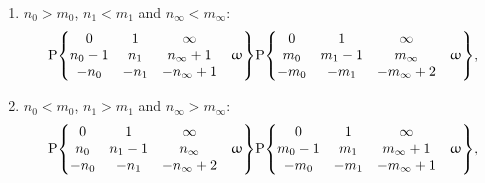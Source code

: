 \begin{enumerate}
   \item $n_{0} > m_{0}$, $n_{1} < m_{1}$ and $n_{\infty} < m_{\infty}$:
     \begin{equation}
       \rP\qty{
         \mqty{
           0
           &
           1
           &
           \infty
           &
           \\
           n_{0} - 1
           &
           n_{1}
           &
           n_{\infty} + 1
           &
           \omega
           \\
           -n_{0}
           &
           -n_{1}
           &
           -n_{\infty} + 1
           &
         }
       }
       \rP\qty{
         \mqty{
           0
           &
           1
           &
           \infty
           &
           \\
           m_{0}
           &
           m_{1} - 1
           &
           m_{\infty}
           &
           \omega
           \\
           -m_{0}
           &
           -m_{1}
           &
           -m_{\infty} + 2
           &
         }
       },
       \label{eq:X_solution><<}
     \end{equation}

   \item $n_{0} < m_{0}$, $n_{1} > m_{1}$ and $n_{\infty} > m_{\infty}$:
     \begin{equation}
       \rP\qty{
         \mqty{
           0
           &
           1
           &
           \infty
           &
           \\
           n_{0}
           &
           n_{1} - 1
           &
           n_{\infty}
           &
           \omega
           \\
           -n_{0}
           &
           -n_{1}
           &
           -n_{\infty} + 2
           &
         }
       }
       \rP\qty{
         \mqty{
           0
           &
           1
           &
           \infty
           &
           \\
           m_{0} - 1
           &
           m_{1}
           &
           m_{\infty} + 1
           &
           \omega
           \\
           -m_{0}
           &
           -m_{1}
           &
           -m_{\infty} + 1
           &
         }
       },
       \label{eq:X_solution<>>}
     \end{equation}


\end{enumerate}
